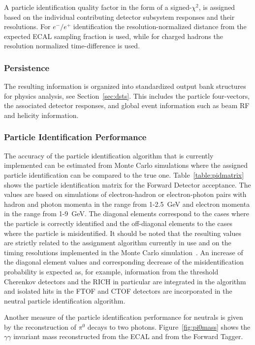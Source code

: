A particle identification quality factor in the form of a signed-$\chi^2$, is assigned based on the individual
contributing detector subsystem responses and their resolutions. For $e^-/e^+$ identification the
resolution-normalized distance from the expected ECAL sampling fraction is used, while for charged hadrons
the resolution normalized time-difference is used.

\subsubsection{Persistence}

The resulting information is organized into standardized output bank structures for physics analysis, see
Section~\ref{sec:dsts}. This includes the particle four-vectors, the associated detector responses, and global
event information such as beam RF and helicity information.

\subsubsection{Particle Identification Performance}

The accuracy of the particle identification algorithm that is currently implemented can be estimated from
Monte Carlo simulations where the assigned particle identification can be compared to the true one.
Table~\ref{table:pidmatrix} shows the particle identification matrix for the Forward Detector acceptance.
The values are based on simulations of electron-hadron or electron-photon pairs with hadron and photon momenta
in the range from 1-2.5~GeV and electron momenta in the range from 1-9~GeV. The diagonal elements correspond
to the cases where the particle is correctly identified and the off-diagonal elements to the cases where the
particle is misidentified. It should be noted that the resulting values are strictly related to the assignment
algorithm currently in use and on the timing resolutions implemented in the Monte Carlo simulation~\cite{sim-nim}.
An increase of the diagonal element values and corresponding decrease of the misidentification probability is
expected as, for example, information from the threshold Cherenkov detectors and the RICH in particular are
integrated in the algorithm and isolated hits in the FTOF and CTOF detectors are incorporated in the neutral
particle identification algorithm.

Another measure of the particle identification performance for neutrals is given by the reconstruction of $\pi^0$
decays to two photons. Figure~\ref{fig:pi0mass} shows the $\gamma \gamma$ invariant mass reconstructed from
the ECAL and from the Forward Tagger.

